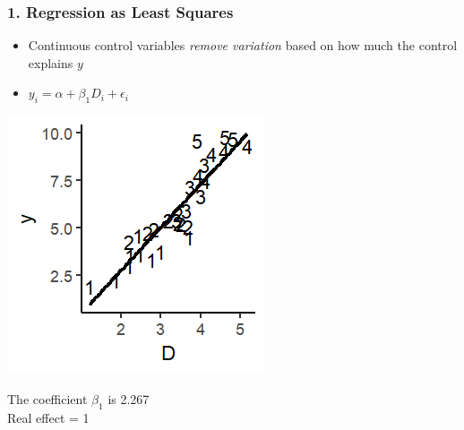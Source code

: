 \documentclass[xcolor=x11names,compress]{beamer}\usepackage[]{graphicx}\usepackage[]{color}
\makeatletter
\def\maxwidth{ %
  \ifdim\Gin@nat@width>\linewidth
    \linewidth
  \else
    \Gin@nat@width
  \fi
}
\newenvironment{knitrout}{}{} %
\renewcommand{\(}{\begin{columns}}
\renewcommand{\)}{\end{columns}}
\newcommand{\<}[1]{\begin{column}{#1}}
\renewcommand{\>}{\end{column}}
\makeatother
\begin{document}
\begin{frame}
\frametitle{1. Regression as Least Squares}
\begin{itemize}
\item Continuous control variables \textit{remove variation} based on how much the control explains $y$
\item $y_i = \alpha + \beta_1 D_i + \epsilon_i$
\end{itemize}
\begin{multicols}{2}
\begin{knitrout}
\color{fgcolor}
\includegraphics[width=\maxwidth]{figure/graph_ols_control2-1} 

\end{knitrout}
\columnbreak
The coefficient $\beta_1$ is 2.267 \\
Real effect = 1
\end{multicols}
\end{frame}
\end{document}
